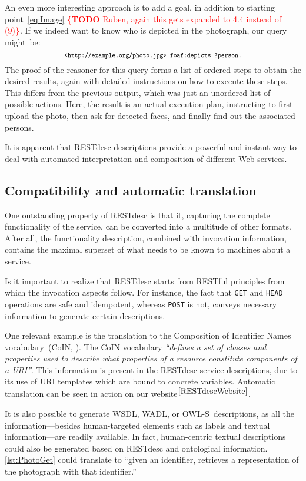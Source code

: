 \documentclass[runningheads,a4paper, twocolumn]{llncs}
\newcommand{\todo}[1]{\noindent\textcolor{red}{{\bf \{TODO} #1{\bf \}}}}
\newcommand{\owls}{\mbox{OWL-S}}
\begin{document}
An even more interesting approach is to add a goal, in addition to starting point~\ref{eq:Image} \todo{Ruben, again this gets expanded to 4.4 instead of (9)}. If we indeed want to know who is depicted in the photograph, our query might~be:
\begin{equation*}\label{eq:Image}
    \fontsize{7.8}{10}\texttt{<http://example.org/photo.jpg> foaf:depicts ?person.}
\end{equation*}
The proof of the reasoner for this query forms a list of ordered steps to obtain the desired results, again with detailed instructions on how to execute these steps. This differs from the previous output, which was just an unordered list of possible actions. Here, the result is an actual execution plan, instructing to first upload the photo, then ask for detected faces, and finally find out the associated persons.

It is apparent that RESTdesc descriptions provide a powerful and instant way to deal with automated interpretation and composition of different Web services.


\subsection{Compatibility and automatic translation}
One outstanding property of RESTdesc is that it, capturing the complete functionality of the service, can be converted into a multitude of other formats. After all, the functionality description, combined with invocation information, contains the maximal superset of what needs to be known to machines about a service.

Is it important to realize that RESTdesc starts from RESTful principles from which the invocation aspects follow. For instance, the fact that \Verb!GET! and \Verb!HEAD! operations are safe and idempotent, whereas \Verb!POST! is not, conveys necessary information to generate certain descriptions.

One relevant example is the translation to the Composition of Identifier Names vocabulary~(CoIN, \cite{CoIN}). The CoIN vocabulary \emph{``defines a set of classes and properties used to describe what properties of a resource constitute components of a URI''}. This information is present in the RESTdesc service descriptions, due to its use of URI templates which are bound to concrete variables. Automatic translation can be seen in action on our website$^{\ref{RESTdescWebsite}}$.

It is also possible to generate WSDL, WADL, or \owls\ descriptions, as all the information---besides human-targeted elements such as labels and textual information---are readily available. In fact, human-centric textual descriptions could also be generated based on RESTdesc and ontological information. \autoref{lst:PhotoGet} could translate to ``given an identifier, retrieves a representation of the photograph with that identifier.''
\end{document}
